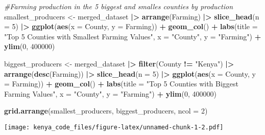 \documentclass[
]{article}
\newenvironment{Shaded}{\begin{snugshade}}{\end{snugshade}}
\newcommand{\AttributeTok}[1]{\textcolor[rgb]{0.13,0.29,0.53}{#1}}
\newcommand{\CommentTok}[1]{\textcolor[rgb]{0.56,0.35,0.01}{\textit{#1}}}
\newcommand{\DecValTok}[1]{\textcolor[rgb]{0.00,0.00,0.81}{#1}}
\newcommand{\FunctionTok}[1]{\textcolor[rgb]{0.13,0.29,0.53}{\textbf{#1}}}
\newcommand{\NormalTok}[1]{#1}
\newcommand{\OtherTok}[1]{\textcolor[rgb]{0.56,0.35,0.01}{#1}}
\newcommand{\SpecialCharTok}[1]{\textcolor[rgb]{0.81,0.36,0.00}{\textbf{#1}}}
\newcommand{\StringTok}[1]{\textcolor[rgb]{0.31,0.60,0.02}{#1}}
\begin{document}
\begin{Shaded}
\begin{Highlighting}[]
\CommentTok{\#Farming production in the 5 biggest and smalles counties by production}
\NormalTok{smallest\_producers }\OtherTok{\textless{}{-}}\NormalTok{ merged\_dataset }\SpecialCharTok{|\textgreater{}} 
  \FunctionTok{arrange}\NormalTok{(Farming) }\SpecialCharTok{|\textgreater{}} 
  \FunctionTok{slice\_head}\NormalTok{(}\AttributeTok{n =} \DecValTok{5}\NormalTok{) }\SpecialCharTok{|\textgreater{}} 
  \FunctionTok{ggplot}\NormalTok{(}\FunctionTok{aes}\NormalTok{(}\AttributeTok{x =}\NormalTok{ County, }\AttributeTok{y =}\NormalTok{ Farming)) }\SpecialCharTok{+}
  \FunctionTok{geom\_col}\NormalTok{() }\SpecialCharTok{+}
  \FunctionTok{labs}\NormalTok{(}\AttributeTok{title =} \StringTok{"Top 5 Counties with Smallest Farming Values"}\NormalTok{,}
       \AttributeTok{x =} \StringTok{"County"}\NormalTok{,}
       \AttributeTok{y =} \StringTok{"Farming"}\NormalTok{) }\SpecialCharTok{+} 
  \FunctionTok{ylim}\NormalTok{(}\DecValTok{0}\NormalTok{, }\DecValTok{400000}\NormalTok{)}

\NormalTok{biggest\_producers }\OtherTok{\textless{}{-}}\NormalTok{ merged\_dataset }\SpecialCharTok{|\textgreater{}} 
  \FunctionTok{filter}\NormalTok{(County }\SpecialCharTok{!=} \StringTok{"Kenya"}\NormalTok{) }\SpecialCharTok{|\textgreater{}} 
  \FunctionTok{arrange}\NormalTok{(}\FunctionTok{desc}\NormalTok{(Farming)) }\SpecialCharTok{|\textgreater{}} 
  \FunctionTok{slice\_head}\NormalTok{(}\AttributeTok{n =} \DecValTok{5}\NormalTok{) }\SpecialCharTok{|\textgreater{}} 
  \FunctionTok{ggplot}\NormalTok{(}\FunctionTok{aes}\NormalTok{(}\AttributeTok{x =}\NormalTok{ County, }\AttributeTok{y =}\NormalTok{ Farming)) }\SpecialCharTok{+}
  \FunctionTok{geom\_col}\NormalTok{() }\SpecialCharTok{+}
  \FunctionTok{labs}\NormalTok{(}\AttributeTok{title =} \StringTok{"Top 5 Counties with Biggest Farming Values"}\NormalTok{,}
       \AttributeTok{x =} \StringTok{"County"}\NormalTok{,}
       \AttributeTok{y =} \StringTok{"Farming"}\NormalTok{) }\SpecialCharTok{+}
  \FunctionTok{ylim}\NormalTok{(}\DecValTok{0}\NormalTok{, }\DecValTok{400000}\NormalTok{)}

\FunctionTok{grid.arrange}\NormalTok{(smallest\_producers, biggest\_producers, }\AttributeTok{ncol =} \DecValTok{2}\NormalTok{)}
\end{Highlighting}
\end{Shaded}

\texttt{[image: kenya\_code\_files/figure-latex/unnamed-chunk-1-2.pdf]}
\end{document}
